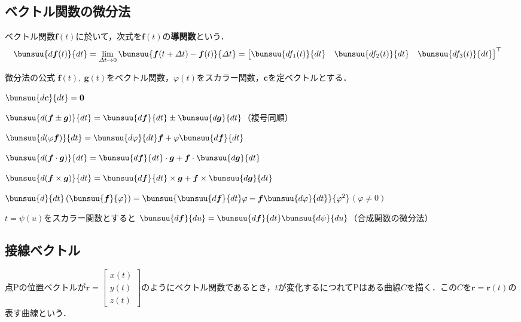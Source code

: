 \subsection{ベクトル関数の微分法}

ベクトル関数$\bm{f}(t)$に於いて，次式を$\bm{f}(t)$の\textbf{導関数}という．
\begin{align}
	\bunsuu{d\bm{f}(t)}{dt} &= \lim_{\varDelta t \to 0} \bunsuu{\bm{f}(t + \varDelta t) - \bm{f}(t)}{\varDelta t} =
	{
	\begin{bmatrix}
		\bunsuu{df_1(t)}{dt} &
		\bunsuu{df_2(t)}{dt} &
		\bunsuu{df_3(t)}{dt}
	\end{bmatrix}
	}^\top
\end{align}

\begin{kousiki}{微分法の公式}
	$\bm{f}(t),\ \bm{g}(t)$をベクトル関数，$\varphi(t)$をスカラー関数，$\bm{c}$を定ベクトルとする．
	\begin{enumerate}[label=\textbf{[\arabic*]}, labelsep=10pt, leftmargin=23pt, itemsep=6pt]
		\item $\bunsuu{d\bm{c}}{dt} = \bm{0}$
		\item $\bunsuu{d(\bm{f} \pm \bm{g})}{dt} = \bunsuu{d\bm{f}}{dt} \pm \bunsuu{d\bm{g}}{dt}$\hfill（複号同順）
		\item $\bunsuu{d(\varphi\bm{f})}{dt} = \bunsuu{d\varphi}{dt}\bm{f} + \varphi\bunsuu{d\bm{f}}{dt}$
		\item $\bunsuu{d(\bm{f} \cdot \bm{g})}{dt} = \bunsuu{d\bm{f}}{dt} \cdot \bm{g} + \bm{f} \cdot \bunsuu{d\bm{g}}{dt}$
		\item $\bunsuu{d(\bm{f} \times \bm{g})}{dt} = \bunsuu{d\bm{f}}{dt} \times \bm{g} + \bm{f} \times \bunsuu{d\bm{g}}{dt}$
		\item $\bunsuu{d}{dt}\left(\bunsuu{\bm{f}}{\varphi}\right) = \bunsuu{\bunsuu{d\bm{f}}{dt}\varphi - \bm{f}\bunsuu{d\varphi}{dt}}{\varphi^2}$\qquad$(\varphi \ne 0)$
		\item $t = \psi(u)$をスカラー関数とすると \qquad $\bunsuu{d\bm{f}}{du} = \bunsuu{d\bm{f}}{dt}\bunsuu{d\psi}{du}$\hfill（合成関数の微分法）
	\end{enumerate}
\end{kousiki}



\subsection{接線ベクトル}

点$\mathrm{P}$の位置ベクトルが$\bm{r} =
\begin{bmatrix}
	x(t)\\ y(t)\\ z(t)
\end{bmatrix}
$のようにベクトル関数であるとき，$t$が変化するにつれて$\mathrm{P}$はある曲線$C$を描く．この$C$を$\bm{r} = \bm{r}(t)$の表す曲線という．

